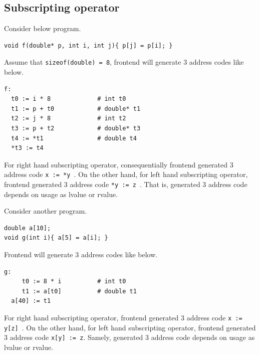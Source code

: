 \subsection{Subscripting operator}
\label{expr_e017}

Consider below program.
\begin{verbatim}
void f(double* p, int i, int j){ p[j] = p[i]; }
\end{verbatim}
Assume that {\tt{sizeof(double) = 8}},
frontend will generate 3 address codes like below.
\begin{verbatim}
f:
  t0 := i * 8             # int t0
  t1 := p + t0            # double* t1
  t2 := j * 8             # int t2
  t3 := p + t2            # double* t3
  t4 := *t1               # double t4
  *t3 := t4
\end{verbatim}
For right hand subscripting operator, 
consequentially frontend generated 3 address code {\tt{x := *y }}.
On the other hand, for left hand subscripting operator,
frontend generated 3 address code {\tt{*y := z }}.
That is, generated 3 address code depends on usage as lvalue or rvalue.

Consider another program.
\begin{verbatim}
double a[10];
void g(int i){ a[5] = a[i]; }
\end{verbatim}
Frontend will generate 3 address codes like below.
\begin{verbatim}
g:
     t0 := 8 * i          # int t0
     t1 := a[t0]          # double t1
  a[40] := t1
\end{verbatim}
For right hand subscripting operator, 
frontend generated 3 address code {\tt{x := y[z] }}.
On the other hand, for left hand subscripting operator,
frontend generated 3 address code {\tt{x[y] := z}}.
Samely, generated 3 address code depends on usage as lvalue or rvalue.

